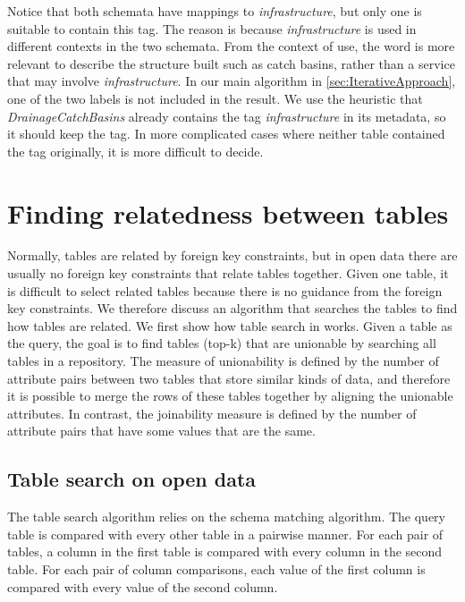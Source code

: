Notice that both schemata have mappings to \textit{infrastructure}, but only one is suitable to contain this tag. The reason is because \textit{infrastructure} is used in different contexts in the two schemata. From the context of use, the word is more relevant to describe the structure built such as catch basins, rather than a service that may involve \textit{infrastructure}. In our main algorithm in \autoref{sec:IterativeApproach}, one of the two labels is not included in the result. We use the heuristic that \textit{DrainageCatchBasins} already contains the tag \textit{infrastructure} in its metadata, so it should keep the tag. In more complicated cases where neither table contained the tag originally, it is more difficult to decide.

\section{Finding relatedness between tables}
\label{sec:FindingRelatednessBetweenTables}

Normally, tables are related by foreign key constraints, but in open data there are usually no foreign key constraints that relate tables together. Given one table, it is difficult to select related tables because there is no guidance from the foreign key constraints. We therefore discuss an algorithm that searches the tables to find how tables are related. We first show how table search in \cite{Nargesian2018Table} works. Given a table as the query, the goal is to find tables (top-k) that are unionable by searching all tables in a repository. The measure of unionability is defined by the number of attribute pairs between two tables that store similar kinds of data, and therefore it is possible to merge the rows of these tables together by aligning the unionable attributes. In contrast, the joinability measure is defined by the number of attribute pairs that have some values that are the same.

\subsection{Table search on open data}
\label{ssec:TableSearchOnOpenData}

The table search algorithm relies on the schema matching algorithm. The query table is compared with every other table in a pairwise manner. For each pair of tables, a column in the first table is compared with every column in the second table. For each pair of column comparisons, each value of the first column is compared with every value of the second column.

